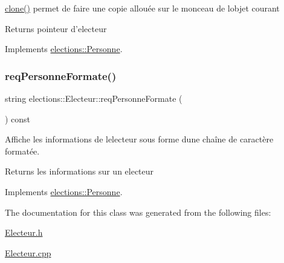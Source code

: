 \hyperlink{classelections_1_1Electeur_a948f48b32633f91670b3b0fde9dff3a4}{clone()} permet de faire une copie allouée sur le monceau de l\textquotesingle{}objet courant 

\begin{DoxyReturn}{Returns}
pointeur d’electeur 
\end{DoxyReturn}


Implements \hyperlink{classelections_1_1Personne}{elections\+::\+Personne}.

\mbox{\label{classelections_1_1Electeur_ac233f4fb12d9267374c8e66864d89689}} 
\subsubsection{\texorpdfstring{req\+Personne\+Formate()}{reqPersonneFormate()}}
{\footnotesize\ttfamily string elections\+::\+Electeur\+::req\+Personne\+Formate (\begin{DoxyParamCaption}{ }\end{DoxyParamCaption}) const\hspace{0.3cm}{\ttfamily [virtual]}}



Affiche les informations de l\textquotesingle{}electeur sous forme d\textquotesingle{}une chaîne de caractère formatée. 

\begin{DoxyReturn}{Returns}
les informations sur un electeur 
\end{DoxyReturn}


Implements \hyperlink{classelections_1_1Personne_aac1232e61b7cb9743bafba9280041d35}{elections\+::\+Personne}.



The documentation for this class was generated from the following files\+:\begin{DoxyCompactItemize}
\item 
\hyperlink{Electeur_8h}{Electeur.\+h}\item 
\hyperlink{Electeur_8cpp}{Electeur.\+cpp}\end{DoxyCompactItemize}
